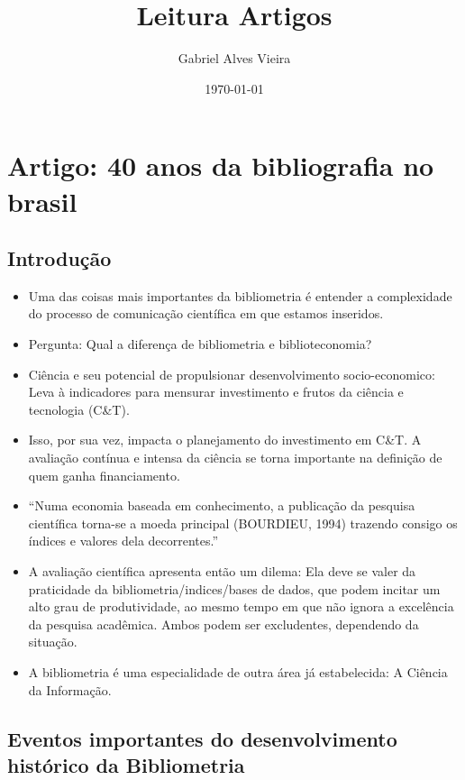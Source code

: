 \documentclass[11pt]{article}
\author{Gabriel Alves Vieira}
\date{\today}
\title{Leitura Artigos}
\begin{document}
\maketitle
\tableofcontents



\section{Artigo: 40 anos da bibliografia no brasil \cite{mugnaini2013}}
\label{sec:orgdd6fd2a}
\subsection{Introdução}
\label{sec:orgf90fa09}

\begin{itemize}
\item Uma das coisas mais importantes da bibliometria é entender a complexidade do processo de comunicação científica em que estamos inseridos.

\item Pergunta: Qual a diferença de bibliometria e biblioteconomia?

\item Ciência e seu potencial de propulsionar desenvolvimento socio-economico: Leva à indicadores para mensurar investimento e frutos da ciência e tecnologia (C\&T).

\item Isso, por sua vez, impacta o planejamento do investimento em C\&T. A avaliação contínua e intensa da ciência se torna importante na definição de quem ganha financiamento.

\item ``Numa economia baseada em conhecimento, a publicação da pesquisa científica torna-se a moeda principal (BOURDIEU, 1994) trazendo consigo os índices e valores dela decorrentes.''

\item A avaliação científica apresenta então um dilema: Ela deve se valer da praticidade da bibliometria/indices/bases de dados, que podem incitar um alto grau de produtividade, ao mesmo tempo em que não ignora a excelência da pesquisa acadêmica. Ambos podem ser excludentes, dependendo da situação.

\item A bibliometria é uma especialidade de outra área já estabelecida: A Ciência da Informação.
\end{itemize}

\subsection{Eventos importantes do desenvolvimento histórico da Bibliometria}
\label{sec:org97ae970}
\end{document}

